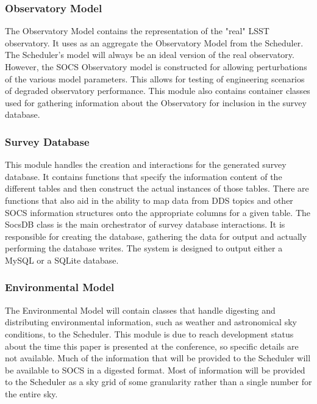 \documentclass[]{spie}  %
\begin{document}
\subsubsection{Observatory Model}

The Observatory Model contains the representation of the "real" LSST observatory. It uses as an aggregate the Observatory Model from the Scheduler. The Scheduler's model will always be an ideal version of the real observatory. However, the SOCS Observatory model is constructed for allowing perturbations of the various model parameters. This allows for testing of engineering scenarios of degraded observatory performance. This module also contains container classes used for gathering information about the Observatory for inclusion in the survey database. 

\subsubsection{Survey Database}

This module handles the creation and interactions for the generated survey database. It contains functions that specify the information content of the different tables and then construct the actual instances of those tables. There are functions that also aid in the ability to map data from DDS topics and other SOCS information structures onto the appropriate columns for a given table. The SocsDB class is the main orchestrator of survey database interactions. It is responsible for creating the database, gathering the data for output and actually performing the database writes. The system is designed to output either a MySQL or a SQLite database.

\subsubsection{Environmental Model}

The Environmental Model will contain classes that handle digesting and distributing environmental information, such as weather and astronomical sky conditions, to the Scheduler. This module is due to reach development status about the time this paper is presented at the conference, so specific details are not available. Much of the information that will be provided to the Scheduler will be available to SOCS in a digested format. Most of information will be provided to the Scheduler as a sky grid of some granularity rather than a single number for the entire sky.
\end{document}
